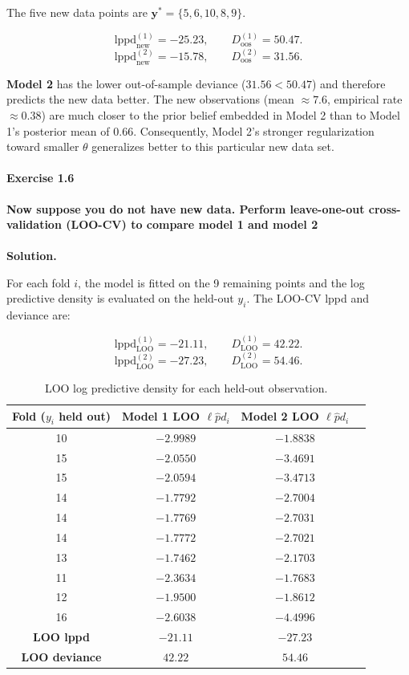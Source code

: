 \documentclass[12pt]{scrartcl}
\begin{document}
The five new data points are $\mathbf{y}^{*} = \{5, 6, 10, 8, 9\}$. 

\[
  \mathrm{lppd}_{\text{new}}^{(1)} = -25.23, \qquad D_{\text{oos}}^{(1)} = 50.47.
\]
\[
  \mathrm{lppd}_{\text{new}}^{(2)} = -15.78, \qquad D_{\text{oos}}^{(2)} = 31.56.
\]

\textbf{Model 2} has the lower out-of-sample deviance ($31.56 < 50.47$) and therefore predicts the new data better. The new observations (mean $\approx 7.6$, empirical rate $\approx 0.38$) are much closer to the prior belief embedded in Model 2 than to Model 1's posterior mean of $0.66$. Consequently, Model 2's stronger regularization toward smaller $\theta$ generalizes better to this particular new data set.

\newpage
\paragraph*{Exercise 1.6} \textbf{Now suppose you do not have new data. Perform leave-one-out cross-validation (LOO-CV) to
compare model 1 and model 2}
\\ \\
\textbf{Solution.}

For each fold $i$, the model is fitted on the 9 remaining points and the log predictive density is evaluated on the held-out $y_i$. The LOO-CV lppd and deviance are:

\[
  \mathrm{lppd}_{\mathrm{LOO}}^{(1)} = -21.11, \qquad D_{\mathrm{LOO}}^{(1)} = 42.22.
\]
\[
  \mathrm{lppd}_{\mathrm{LOO}}^{(2)} = -27.23, \qquad D_{\mathrm{LOO}}^{(2)} = 54.46.
\]


\begin{table}[H]
\centering
\caption{LOO log predictive density for each held-out observation.}
\label{tab:loo}
\begin{tabular}{cccc}
\toprule
Fold ($y_i$ held out) & Model 1 LOO $\ell\hat{p}d_i$ & Model 2 LOO $\ell\hat{p}d_i$ \\
\midrule
10 & $-2.9989$ & $-1.8838$ \\
15 & $-2.0550$ & $-3.4691$ \\
15 & $-2.0594$ & $-3.4713$ \\
14 & $-1.7792$ & $-2.7004$ \\
14 & $-1.7769$ & $-2.7031$ \\
14 & $-1.7772$ & $-2.7021$ \\
13 & $-1.7462$ & $-2.1703$ \\
11 & $-2.3634$ & $-1.7683$ \\
12 & $-1.9500$ & $-1.8612$ \\
16 & $-2.6038$ & $-4.4996$ \\
\midrule
\textbf{LOO lppd} & $\mathbf{-21.11}$ & $\mathbf{-27.23}$ \\
\textbf{LOO deviance} & $\mathbf{42.22}$ & $\mathbf{54.46}$ \\
\bottomrule
\end{tabular}
\end{table}
\end{document}

